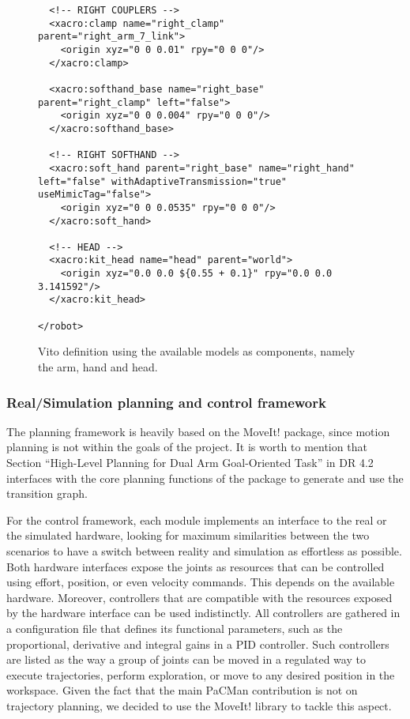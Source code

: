 \begin{figure}
\begin{verbatim}
  <!-- RIGHT COUPLERS -->
  <xacro:clamp name="right_clamp" parent="right_arm_7_link">
    <origin xyz="0 0 0.01" rpy="0 0 0"/>
  </xacro:clamp>

  <xacro:softhand_base name="right_base" parent="right_clamp" left="false">
    <origin xyz="0 0 0.004" rpy="0 0 0"/>
  </xacro:softhand_base>

  <!-- RIGHT SOFTHAND -->
  <xacro:soft_hand parent="right_base" name="right_hand" left="false" withAdaptiveTransmission="true" useMimicTag="false">
    <origin xyz="0 0 0.0535" rpy="0 0 0"/>
  </xacro:soft_hand>

  <!-- HEAD -->
  <xacro:kit_head name="head" parent="world">
    <origin xyz="0.0 0.0 ${0.55 + 0.1}" rpy="0.0 0.0 3.141592"/>
  </xacro:kit_head>

</robot>
\end{verbatim}
\caption{Vito definition using the available models as components, namely the arm, hand and head.}
\label{fig:vito}
\end{figure}


\subsubsection{Real/Simulation planning and control framework}

The planning framework is heavily based on the MoveIt! package, since motion planning is not within the goals of the project. It is worth to mention that Section ``High-Level Planning for Dual Arm Goal-Oriented Task'' in DR 4.2 interfaces with the core planning functions of the package to generate and use the transition graph.

For the control framework, each module implements an interface to the real or the simulated hardware, looking for maximum similarities between the two scenarios to have a switch between reality and simulation as effortless as possible. Both hardware interfaces expose the joints as resources that can be controlled using effort, position, or even velocity commands. This depends on the available hardware. Moreover, controllers that are compatible with the resources exposed by the hardware interface can be used indistinctly. All controllers are gathered in a configuration file that defines its functional parameters, such as the proportional, derivative and integral gains in a PID controller. Such controllers are listed as the way a group of joints can be moved in a regulated way to execute trajectories, perform exploration, or move to any desired position in the workspace. Given the fact that the main PaCMan contribution is not on trajectory planning, we decided to use the MoveIt! library to tackle this aspect.

